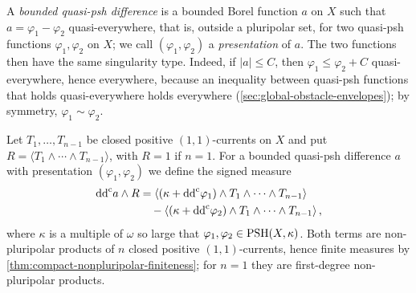 A \emph{bounded quasi-psh difference} is a bounded Borel function $a$ on $X$ such that $a=\varphi_1-\varphi_2$ quasi-everywhere, that is, outside a pluripolar set, for two quasi-psh functions $\varphi_1,\varphi_2$ on $X$; we call $(\varphi_1,\varphi_2)$ a \emph{presentation} of $a$. The two functions then have the same singularity type. Indeed, if $|a|\leq C$, then $\varphi_1\leq\varphi_2+C$ quasi-everywhere, hence everywhere, because an inequality between quasi-psh functions that holds quasi-everywhere holds everywhere (\cref{sec:global-obstacle-envelopes}); by symmetry, $\varphi_1\sim\varphi_2$.

Let $T_1,\ldots,T_{n-1}$ be closed positive $(1,1)$-currents on $X$ and put $R=\langle T_1\wedge\cdots\wedge T_{n-1}\rangle$, with $R=1$ if $n=1$. For a bounded quasi-psh difference $a$ with presentation $(\varphi_1,\varphi_2)$ we define the signed measure
\begin{equation}\label{eq:bounded-difference-hessian-product}
 \begin{aligned}
 \mathrm{dd}^{\mathrm{c}} a\wedge R
   &=\left\langle(\kappa+\mathrm{dd}^{\mathrm{c}}\varphi_1)\wedge T_1\wedge\cdots\wedge T_{n-1}\right\rangle\\
    &\quad-\left\langle(\kappa+\mathrm{dd}^{\mathrm{c}}\varphi_2)\wedge T_1\wedge\cdots\wedge T_{n-1}\right\rangle,
 \end{aligned}
\end{equation}
where $\kappa$ is a multiple of $\omega$ so large that $\varphi_1,\varphi_2\in\mathrm{PSH}(X,\kappa)$. Both terms are non-pluripolar products of $n$ closed positive $(1,1)$-currents, hence finite measures by \cref{thm:compact-nonpluripolar-finiteness}; for $n=1$ they are first-degree non-pluripolar products.

